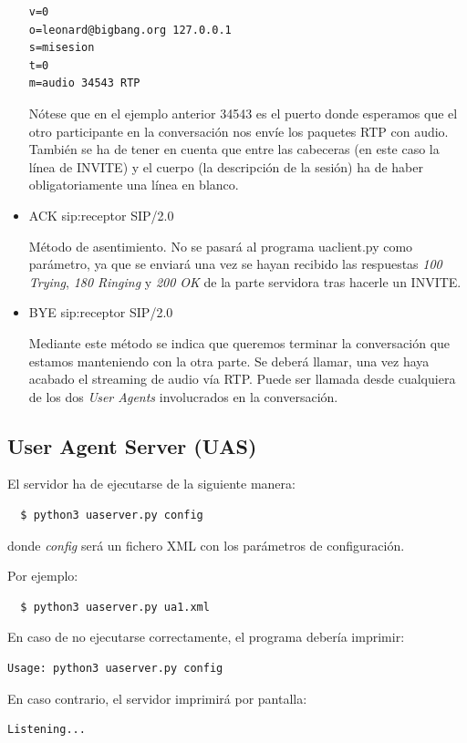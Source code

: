 \documentclass[a4paper,11pt]{article}
\begin{document}
\begin{itemize}
\begin{verbatim}
v=0
o=leonard@bigbang.org 127.0.0.1
s=misesion
t=0
m=audio 34543 RTP
\end{verbatim}

Nótese que en el ejemplo anterior 34543 es el puerto donde esperamos que el otro participante en la conversación nos envíe los paquetes RTP con audio. También se ha de tener en cuenta que entre las cabeceras (en este caso la línea de INVITE) y el cuerpo (la descripción de la sesión) ha de haber obligatoriamente una línea en blanco.

    \item ACK sip:receptor SIP/2.0

    Método de asentimiento. No se pasará al programa uaclient.py como parámetro, ya que se enviará una vez se hayan recibido las respuestas \emph{100 Trying}, \emph{180 Ringing} y \emph{200 OK} de la parte servidora tras hacerle un INVITE.

    \item BYE sip:receptor SIP/2.0

    Mediante este método se indica que queremos terminar la conversación que estamos manteniendo con la otra parte. Se deberá llamar, una vez haya acabado el streaming de audio vía RTP. Puede ser llamada desde cualquiera de los dos \emph{User Agents} involucrados en la conversación.

  \end{itemize}


\subsection{User Agent Server (UAS)}

El servidor ha de ejecutarse de la siguiente manera:
\begin{verbatim}
  $ python3 uaserver.py config
\end{verbatim}

donde \emph{config} será un fichero XML con los parámetros de configuración.

Por ejemplo:
\begin{verbatim}
  $ python3 uaserver.py ua1.xml
\end{verbatim}

En caso de no ejecutarse correctamente, el programa debería imprimir:
\begin{verbatim}
Usage: python3 uaserver.py config
\end{verbatim}

En caso contrario, el servidor imprimirá por pantalla:
\begin{verbatim}
Listening...
\end{verbatim}
\end{document}
